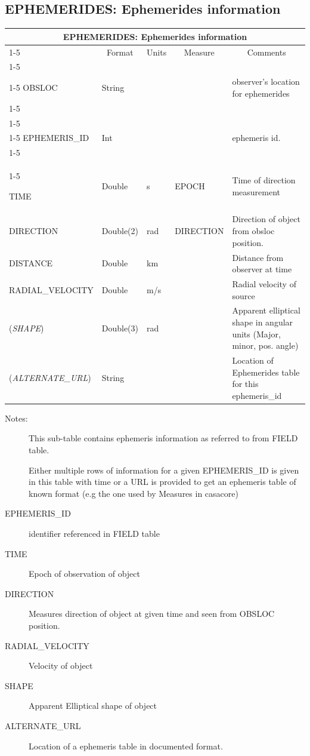 \documentclass{article}
\newcommand{\defline}[1]{\cline{1-5}
\multicolumn{5}{|l|}{#1} \\
\cline{1-5}}
\newcommand{\definetable}[2]
{
	\vfill\newpage
	\subsection{#1}
        \vspace{0.15in}
        \small
	\begin{tabular}{|l|p{1.25in}|l|p{.9in}|p{1.4in}|}
	\hline
	\multicolumn{5}{|c|}{\bf #1}\\ 
	\cline{1-5}
        \multicolumn{1}{|c|}{Name}&\multicolumn{1}{|c|}{Format}&
        \multicolumn{1}{|c|}{Units}&\multicolumn{1}{|c|}{Measure}&
        \multicolumn{1}{|c|}{Comments}\\
        \cline{1-5}
        #2
        \hline
	\end{tabular}
}
\begin{document}
\definetable{EPHEMERIDES: Ephemerides information}{

\defline{\em Keywords}
OBSLOC  &  String &  & &  observer's location for ephemerides \\
\defline{\bf Columns}
\defline{\em Key}
EPHEMERIS\_ID  & Int & & & ephemeris id.\\
\defline{\em Data}

TIME & Double & s & EPOCH & Time of direction measurement\\
DIRECTION & Double(2) & rad & DIRECTION & Direction of object from obsloc position.\\
DISTANCE & Double & km &  & Distance from observer at time\\
RADIAL\_VELOCITY & Double & m/s & & Radial velocity of source \\
({\it SHAPE}) & Double(3) & rad & &  Apparent elliptical shape in angular units (Major, minor, pos. angle)\\
({\it ALTERNATE\_URL}) & String & & & Location of Ephemerides table for this ephemeris\_id \\
}
\begin{description}

\item[Notes:] This sub-table contains ephemeris  information as referred to 
from FIELD table.
 
Either multiple rows of information for a given EPHEMERIS\_ID is given in this table with time or 
a URL is provided to get an ephemeris table of known format (e.g the one used by Measures in casacore)

\item[EPHEMERIS\_ID] identifier referenced in FIELD table

\item[TIME] Epoch of observation of object

\item[DIRECTION] Measures direction of object at given time and seen from OBSLOC position.

\item[RADIAL\_VELOCITY] Velocity of object

\item[SHAPE] Apparent Elliptical shape of object

\item[ALTERNATE\_URL] Location of a ephemeris table in documented  format.

\end{description}
\end{document}
